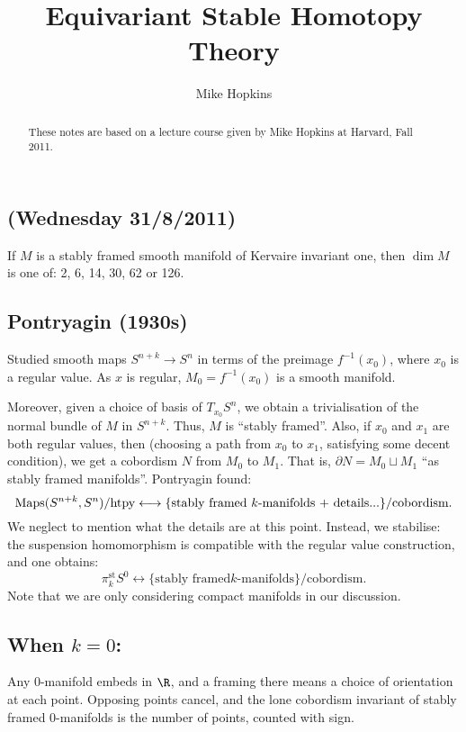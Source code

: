 \documentclass[11pt]{article}
\title{Equivariant Stable Homotopy Theory}
\author{Mike Hopkins}
\date{}
\newcommand{\NewLecture}[3]{\section{#1 {\small(#2/#3/2011)}}}
\begin{document}
\maketitle
\begin{abstract}
These notes are based on a lecture course given by Mike Hopkins at Harvard, Fall 2011. %
\end{abstract}
\tableofcontents
\pagebreak
\begin{FirstNineLectures}
\NewLecture{}{Wednesday 31}{8}
\begin{thm*}
If $M$ is a stably framed smooth manifold of Kervaire invariant one, then $\dim
M$ is one of: 2, 6, 14, 30, 62 or 126.
\end{thm*}
\subsection*{Pontryagin (1930s)}
Studied smooth maps $S^{n+k}\to S^n$ in terms
of the preimage $f^{-1}(x_0)$, where $x_0$ is a regular value. As $x$ is
regular, $M_0=f^{-1}(x_0)$ is a smooth manifold.

Moreover, given a choice of basis of $T_{x_0}S^n$, we obtain a trivialisation of
the normal bundle of $M$ in $S^{n+k}$. Thus, $M$ is ``stably framed''. Also, if
$x_0$ and $x_1$ are both regular values, then (choosing a path from $x_0$ to
$x_1$, satisfying some decent condition), we get a cobordism $N$ from $M_0$ to
$M_1$. That is, $\partial N=M_0\sqcup M_1$ ``as stably framed manifolds''.
Pontryagin found:
\[\operatorname{Maps}(S^{n+k},S^n)/\text{htpy}\longleftrightarrow\{\text{stably framed
$k$-manifolds + details...}\}/\text{cobordism}.\]
We neglect to mention what the details are at this point. Instead, we stabilise:
the suspension homomorphism is compatible with the regular value construction,
and one obtains:
\[\pi_k^\text{st}S^0\longleftrightarrow\{\text{stably framed
$k$-manifolds}\}/\text{cobordism}.\]
Note that we are only considering compact manifolds in our discussion.
\subsection*{When \texorpdfstring{$k=0$}{k=0}:}
Any $0$-manifold embeds in $\R$, and a framing there means a choice of
orientation at each point. Opposing points cancel, and the lone cobordism
invariant of stably framed $0$-manifolds is the number of points, counted with
sign.


\end{FirstNineLectures}
\end{document}
